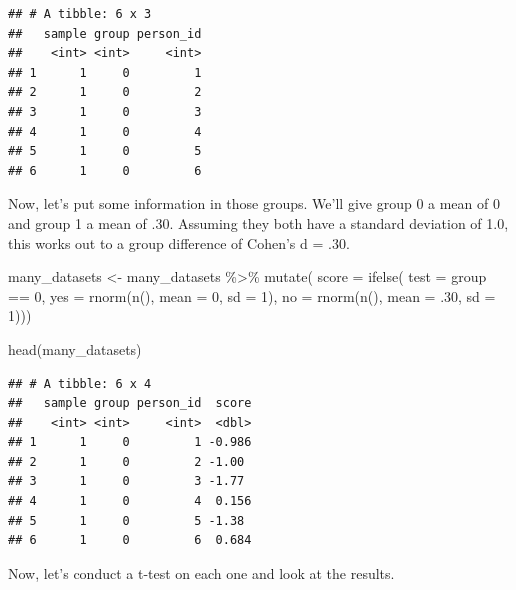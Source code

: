 \documentclass[
]{book}
\newenvironment{Shaded}{\begin{snugshade}}{\end{snugshade}}
\newcommand{\AttributeTok}[1]{\textcolor[rgb]{0.77,0.63,0.00}{#1}}
\newcommand{\DecValTok}[1]{\textcolor[rgb]{0.00,0.00,0.81}{#1}}
\newcommand{\FunctionTok}[1]{\textcolor[rgb]{0.00,0.00,0.00}{#1}}
\newcommand{\NormalTok}[1]{#1}
\newcommand{\OtherTok}[1]{\textcolor[rgb]{0.56,0.35,0.01}{#1}}
\newcommand{\SpecialCharTok}[1]{\textcolor[rgb]{0.00,0.00,0.00}{#1}}
\begin{document}
\begin{verbatim}
## # A tibble: 6 x 3
##   sample group person_id
##    <int> <int>     <int>
## 1      1     0         1
## 2      1     0         2
## 3      1     0         3
## 4      1     0         4
## 5      1     0         5
## 6      1     0         6
\end{verbatim}

Now, let's put some information in those groups. We'll give group 0 a mean of 0 and group 1 a mean of .30. Assuming they both have a standard deviation of 1.0, this works out to a group difference of Cohen's d = .30.

\begin{Shaded}
\begin{Highlighting}[]
\NormalTok{many\_datasets }\OtherTok{\textless{}{-}}\NormalTok{ many\_datasets }\SpecialCharTok{\%\textgreater{}\%} 
  \FunctionTok{mutate}\NormalTok{(}
    \AttributeTok{score =} \FunctionTok{ifelse}\NormalTok{(}
      \AttributeTok{test =}\NormalTok{ group }\SpecialCharTok{==} \DecValTok{0}\NormalTok{,}
      \AttributeTok{yes =} \FunctionTok{rnorm}\NormalTok{(}\FunctionTok{n}\NormalTok{(), }\AttributeTok{mean =} \DecValTok{0}\NormalTok{, }\AttributeTok{sd =} \DecValTok{1}\NormalTok{),}
      \AttributeTok{no =} \FunctionTok{rnorm}\NormalTok{(}\FunctionTok{n}\NormalTok{(), }\AttributeTok{mean =}\NormalTok{ .}\DecValTok{30}\NormalTok{, }\AttributeTok{sd =} \DecValTok{1}\NormalTok{)))}

\FunctionTok{head}\NormalTok{(many\_datasets)}
\end{Highlighting}
\end{Shaded}

\begin{verbatim}
## # A tibble: 6 x 4
##   sample group person_id  score
##    <int> <int>     <int>  <dbl>
## 1      1     0         1 -0.986
## 2      1     0         2 -1.00 
## 3      1     0         3 -1.77 
## 4      1     0         4  0.156
## 5      1     0         5 -1.38 
## 6      1     0         6  0.684
\end{verbatim}

Now, let's conduct a t-test on each one and look at the results.
\end{document}

